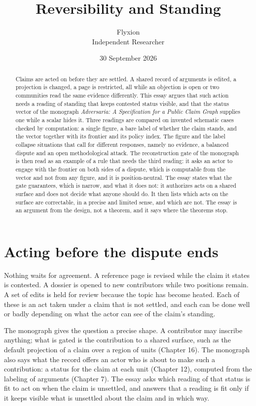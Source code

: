 \documentclass[11pt]{article}
\title{Reversibility and Standing}
\author{Flyxion\\\small Independent Researcher}
\date{30 September 2026}
\begin{document}
\maketitle

\begin{abstract}
\noindent
Claims are acted on before they are settled. A shared record of arguments is edited, a projection is changed, a page is restricted, all while an objection is open or two communities read the same evidence differently. This essay argues that such action needs a reading of standing that keeps contested status visible, and that the status vector of the monograph \emph{Adversaria: A Specification for a Public Claim Graph} supplies one while a scalar hides it. Three readings are compared on invented schematic cases checked by computation: a single figure, a bare label of whether the claim stands, and the vector together with its frontier and its policy index. The figure and the label collapse situations that call for different responses, namely no evidence, a balanced dispute and an open methodological attack. The reconstruction gate of the monograph is then read as an example of a rule that needs the third reading: it asks an actor to engage with the frontier on both sides of a dispute, which is computable from the vector and not from any figure, and it is position-neutral. The essay states what the gate guarantees, which is narrow, and what it does not: it authorizes acts on a shared surface and does not decide what anyone should do. It then lists which acts on the surface are correctable, in a precise and limited sense, and which are not. The essay is an argument from the design, not a theorem, and it says where the theorems stop.
\end{abstract}

\section{Acting before the dispute ends}\label{sec:acting}

Nothing waits for agreement. A reference page is revised while the claim it states is contested. A dossier is opened to new contributors while two positions remain. A set of edits is held for review because the topic has become heated. Each of these is an act taken under a claim that is not settled, and each can be done well or badly depending on what the actor can see of the claim's standing.

The monograph gives the question a precise shape. A contributor may inscribe anything; what is gated is the contribution to a shared surface, such as the default projection of a claim over a region of units (Chapter 16). The monograph also says what the record offers an actor who is about to make such a contribution: a status for the claim at each unit (Chapter 12), computed from the labeling of arguments (Chapter 7). The essay asks which reading of that status is fit to act on when the claim is unsettled, and answers that a reading is fit only if it keeps visible what is unsettled about the claim and in which way.
\end{document}
